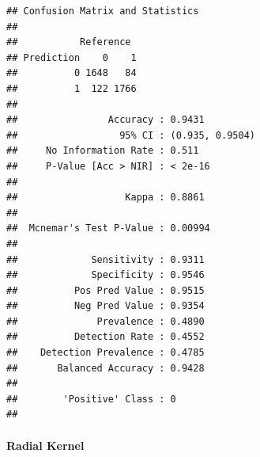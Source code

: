\documentclass[
]{article}
\newenvironment{Shaded}{\begin{snugshade}}{\end{snugshade}}
\newcommand{\AttributeTok}[1]{\textcolor[rgb]{0.77,0.63,0.00}{#1}}
\newcommand{\DecValTok}[1]{\textcolor[rgb]{0.00,0.00,0.81}{#1}}
\newcommand{\FloatTok}[1]{\textcolor[rgb]{0.00,0.00,0.81}{#1}}
\newcommand{\FunctionTok}[1]{\textcolor[rgb]{0.00,0.00,0.00}{#1}}
\newcommand{\NormalTok}[1]{#1}
\newcommand{\OtherTok}[1]{\textcolor[rgb]{0.56,0.35,0.01}{#1}}
\newcommand{\SpecialCharTok}[1]{\textcolor[rgb]{0.00,0.00,0.00}{#1}}
\begin{document}
\begin{Shaded}
\end{Shaded}

\begin{verbatim}
## Confusion Matrix and Statistics
## 
##           Reference
## Prediction    0    1
##          0 1648   84
##          1  122 1766
##                                          
##                Accuracy : 0.9431         
##                  95% CI : (0.935, 0.9504)
##     No Information Rate : 0.511          
##     P-Value [Acc > NIR] : < 2e-16        
##                                          
##                   Kappa : 0.8861         
##                                          
##  Mcnemar's Test P-Value : 0.00994        
##                                          
##             Sensitivity : 0.9311         
##             Specificity : 0.9546         
##          Pos Pred Value : 0.9515         
##          Neg Pred Value : 0.9354         
##              Prevalence : 0.4890         
##          Detection Rate : 0.4552         
##    Detection Prevalence : 0.4785         
##       Balanced Accuracy : 0.9428         
##                                          
##        'Positive' Class : 0              
## 
\end{verbatim}

\hypertarget{radial-kernel}{%
\paragraph{Radial Kernel}\label{radial-kernel}}
\end{document}
